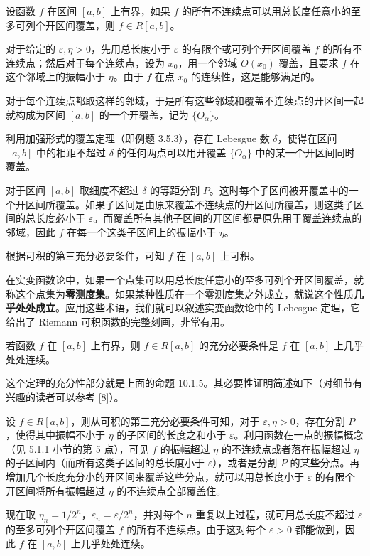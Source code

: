 \begin{xtheorem}[10.1.5]
设函数 $f$ 在区间 $[a,b]$ 上有界，如果 $f$ 的所有不连续点可以用总长度任意小的至多可列个开区间覆盖，则 $f\in R[a,b]$。
\end{xtheorem}
\begin{xproof}
对于给定的 $\varepsilon,\eta>0$，先用总长度小于 $\varepsilon$ 的有限个或可列个开区间覆盖 $f$ 的所有不连续点；然后对于每个连续点，设为 $x_0$，用一个邻域 $O(x_0)$ 覆盖，且要求 $f$ 在这个邻域上的振幅小于 $\eta$。由于 $f$ 在点 $x_0$ 的连续性，这是能够满足的。

对于每个连续点都取这样的邻域，于是所有这些邻域和覆盖不连续点的开区间一起就构成为区间 $[a,b]$ 的一个开覆盖，记为 $\{O_\alpha\}$。

利用加强形式的覆盖定理（即例题 3.5.3），存在 Lebesgue 数 $\delta$，使得在区间 $[a,b]$ 中的相距不超过 $\delta$ 的任何两点可以用开覆盖 $\{O_\alpha\}$ 中的某一个开区间同时覆盖。

对于区间 $[a,b]$ 取细度不超过 $\delta$ 的等距分割 $P$。这时每个子区间被开覆盖中的一个开区间所覆盖。如果子区间是由原来覆盖不连续点的开区间所覆盖，则这类子区间的总长度必小于 $\varepsilon$。而覆盖所有其他子区间的开区间都是原先用于覆盖连续点的邻域，因此 $f$ 在每一个这类子区间上的振幅小于 $\eta$。

根据可积的第三充分必要条件，可知 $f$ 在 $[a,b]$ 上可积。
\end{xproof}

\begin{xremark}
在实变函数论中，如果一个点集可以用总长度任意小的至多可列个开区间覆盖，就称这个点集为\textbf{零测度集}。如果某种性质在一个零测度集之外成立，就说这个性质\textbf{几乎处处成立}。应用这些术语，我们就可以叙述实变函数论中的 Lebesgue 定理，它给出了 Riemann 可积函数的完整刻画，非常有用。
\end{xremark}

\begin{xtheorem}[10.1.6（Lebesgue 定理）]
若函数 $f$ 在 $[a,b]$ 上有界，则 $f\in R[a,b]$ 的充分必要条件是 $f$ 在 $[a,b]$ 上几乎处处连续。
\end{xtheorem}
\begin{xproof}
这个定理的充分性部分就是上面的命题 10.1.5。其必要性证明简述如下（对细节有兴趣的读者可以参考 [8]）。

设 $f\in R[a,b]$，则从可积的第三充分必要条件可知，对于 $\varepsilon,\eta>0$，存在分割 $P$，使得其中振幅不小于 $\eta$ 的子区间的长度之和小于 $\varepsilon$。利用函数在一点的振幅概念（见 5.1.1 小节的第 5 点），可见 $f$ 的振幅超过 $\eta$ 的不连续点或者落在振幅超过 $\eta$ 的子区间内（而所有这类子区间的总长度小于 $\varepsilon$），或者是分割 $P$ 的某些分点。再增加几个长度充分小的开区间来覆盖这些分点，就可以用总长度小于 $\varepsilon$ 的有限个开区间将所有振幅超过 $\eta$ 的不连续点全部覆盖住。

现在取 $\eta_n=1/2^n$，$\varepsilon_n=\varepsilon/2^n$，并对每个 $n$ 重复以上过程，就可用总长度不超过 $\varepsilon$ 的至多可列个开区间覆盖 $f$ 的所有不连续点。由于这对每个 $\varepsilon>0$ 都能做到，因此 $f$ 在 $[a,b]$ 上几乎处处连续。
\end{xproof}

